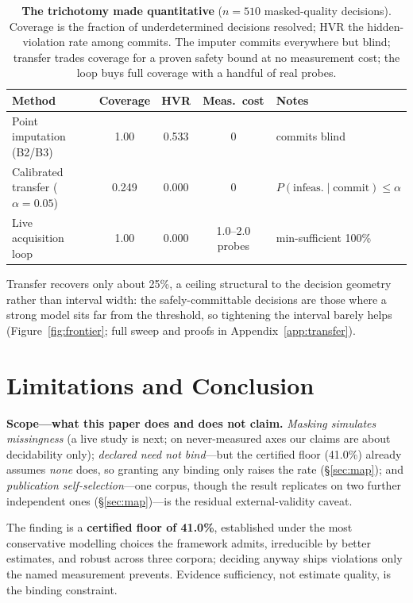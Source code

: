 \documentclass{article} %
\begin{document}
\begin{table}[h]
\centering
\footnotesize
\caption{\textbf{The trichotomy made quantitative} ($n{=}510$ masked-quality decisions). Coverage is the fraction of underdetermined decisions resolved; HVR the hidden-violation rate among commits. The imputer commits everywhere but blind; transfer trades coverage for a proven safety bound at no measurement cost; the loop buys full coverage with a handful of real probes.}\label{tab:resolve}
\setlength{\tabcolsep}{5pt}
\begin{tabular}{@{}lcccl@{}}
\toprule
Method & Coverage & HVR & Meas.\ cost & Notes \\
\midrule
Point imputation (B2/B3) & 1.00 & 0.533 & 0 & commits blind \\
Calibrated transfer ($\alpha{=}0.05$) & 0.249 & 0.000 & 0 & $P(\text{infeas.}\mid\text{commit})\le\alpha$ \\
Live acquisition loop & 1.00 & 0.000 & 1.0--2.0 probes & min-sufficient 100\% \\
\bottomrule
\end{tabular}
\end{table}

Transfer recovers only about 25\%, a ceiling structural to the decision geometry rather than interval width: the safely-committable decisions are those where a strong model sits far from the threshold, so tightening the interval barely helps (Figure~\ref{fig:frontier}; full sweep and proofs in Appendix~\ref{app:transfer}).

\section{Limitations and Conclusion}
\label{sec:limitations}

 \textbf{Scope---what this paper does and does not claim.} \emph{Masking simulates missingness} (a live study is next; on never-measured axes our claims are about decidability only); \emph{declared need not bind}---but the certified floor (41.0\%) already assumes \emph{none} does, so granting any binding only raises the rate (\S\ref{sec:map}); and \emph{publication self-selection}---one corpus, though the result replicates on two further independent ones (\S\ref{sec:map})---is the residual external-validity caveat.

 The finding is a \textbf{certified floor of 41.0\%}, established under the most conservative modelling choices the framework admits, irreducible by better estimates, and robust across three corpora; deciding anyway ships violations only the named measurement prevents. Evidence sufficiency, not estimate quality, is the binding constraint.
\end{document}
